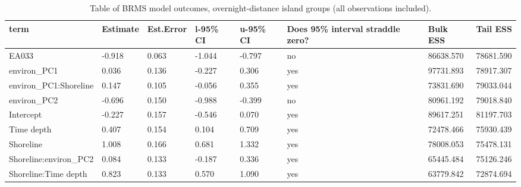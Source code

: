 \begin{table}[ht]
\centering
\begin{tabular}{p{5cm}p{2cm}p{2cm}p{2cm}p{2cm}p{2cm}p{2cm}p{2cm}}
  \toprule
term & Estimate & Est.Error & l-95\% CI & u-95\% CI & Does 95\% interval straddle zero? & Bulk ESS & Tail ESS \\ 
  \midrule
EA033 & -0.918 & 0.063 & -1.044 & -0.797 & no & 86638.570 & 78681.590 \\ 
  environ\_PC1 & 0.036 & 0.136 & -0.227 & 0.306 & yes & 97731.893 & 78917.307 \\ 
  environ\_PC1:Shoreline & 0.147 & 0.105 & -0.056 & 0.355 & yes & 73831.690 & 79033.044 \\ 
  environ\_PC2 & -0.696 & 0.150 & -0.988 & -0.399 & no & 80961.192 & 79018.840 \\ 
  Intercept & -0.227 & 0.157 & -0.546 & 0.070 & yes & 89617.251 & 81197.703 \\ 
  Time depth & 0.407 & 0.154 & 0.104 & 0.709 & yes & 72478.466 & 75930.439 \\ 
  Shoreline & 1.008 & 0.166 & 0.681 & 1.332 & yes & 78008.053 & 75478.131 \\ 
  Shoreline:environ\_PC2 & 0.084 & 0.133 & -0.187 & 0.336 & yes & 65445.484 & 75126.246 \\ 
  Shoreline:Time depth & 0.823 & 0.133 & 0.570 & 1.090 & yes & 63779.842 & 72874.694 \\ 
   \bottomrule
\end{tabular}
\caption{Table of BRMS model outcomes, overnight-distance island groups (all observations included).} 
\label{BRMS_effects_SBZR}
\end{table}
